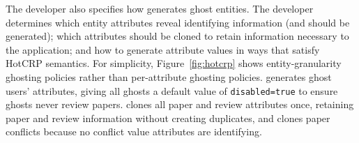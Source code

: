 The developer also specifies how \sys generates ghost entities. The developer determines which entity
attributes reveal identifying information (and should be generated); which attributes should be
cloned to retain information necessary to the application; and how to generate attribute values in
ways that satisfy HotCRP semantics. 
For simplicity, Figure~\ref{fig:hotcrp} shows entity-granularity ghosting policies rather than
per-attribute ghosting policies.
\sys generates ghost users' attributes, giving all ghosts a default value of \texttt{disabled=true}
to ensure ghosts never review papers. \sys clones all paper and review attributes once, retaining
paper and review information without creating duplicates, and clones paper conflicts because no conflict
value attributes are identifying.


%

